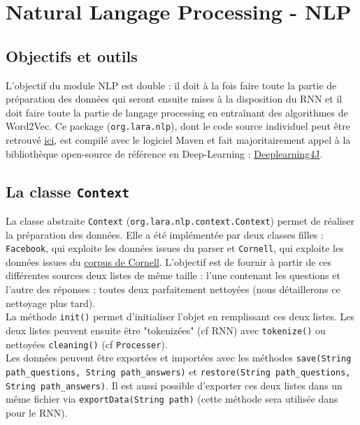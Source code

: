 \documentclass[10pt,a4paper]{article}
\newcommand\tab[1][0.5cm]{\hspace*{#1}}
\begin{document}
\section{Natural Langage Processing - NLP}
\subsection{Objectifs et outils}
L'objectif du module NLP est double : il doit à la fois faire toute la partie de préparation des données qui seront ensuite mises à la disposition du RNN et il doit faire toute la partie de langage processing en entraînant des algorithmes de Word2Vec. Ce package (\texttt{org.lara.nlp}), dont le code source individuel peut être retrouvé \href{https://github.com/LaraProject/nlp}{ici}, est compilé avec le logiciel Maven et fait majoritairement appel à la bibliothèque open-source de référence en Deep-Learning : \href{https://deeplearning4j.konduit.ai/}{Deeplearning4J}.
\subsection{La classe \texttt{Context}}
La classe abstraite \texttt{Context} (\texttt{org.lara.nlp.context.Context}) permet de réaliser la préparation des données. Elle a été implémentée par deux classes filles : \texttt{Facebook}, qui exploite les données issues du parser et \texttt{Cornell}, qui exploite les données issues du \href{https://www.cs.cornell.edu/~cristian/Cornell_Movie-Dialogs_Corpus.html}{corpus de Cornell}. L'objectif est de fournir à partir de ces différentes sources deux listes de même taille : l'une contenant les questions et l'autre des réponses ; toutes deux parfaitement nettoyées (nous détaillerons ce nettoyage plus tard). \\
\tab La méthode \texttt{init()} permet d'initialiser l'objet en remplissant ces deux listes. Les deux listes peuvent ensuite être "tokenizées" (cf RNN) avec \texttt{tokenize()} ou nettoyées \texttt{cleaning()} (cf \texttt{Processer}). \\
\tab Les données peuvent être exportées et importées avec les méthodes \texttt{save(String path\_questions, String path\_answers)} et \texttt{restore(String path\_questions, String path\_answers)}. Il est aussi possible d'exporter ces deux listes dans un même fichier via \texttt{exportData(String path)} (cette méthode sera utilisée dans pour le RNN).
\end{document}
